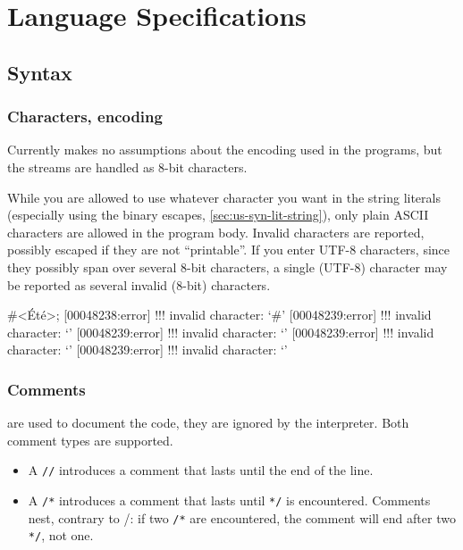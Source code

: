 \chapter{\us Language Specifications}
\label{sec:lang}

\section{Syntax}

\subsection{Characters, encoding}

Currently \us makes no assumptions about the encoding used in the
programs, but the streams are handled as 8-bit characters.

While you are allowed to use whatever character you want in the string
literals (especially using the binary escapes,
\autoref{sec:us-syn-lit-string}), only plain ASCII characters are
allowed in the program body.  Invalid characters are reported,
possibly escaped if they are not ``printable''.  If you enter UTF-8
characters, since they possibly span over several 8-bit characters, a
single (UTF-8) character may be reported as several invalid (8-bit)
characters.

\begin{urbiscript}[escapeinside=<>,firstnumber=last]
#<Été>;
[00048238:error] !!! invalid character: `#'
[00048239:error] !!! invalid character: `'
[00048239:error] !!! invalid character: `'
[00048239:error] !!! invalid character: `'
[00048239:error] !!! invalid character: `'
\end{urbiscript}

\subsection{Comments}

 are used to document the code, they are ignored by the
\us interpreter. Both \Cxx comment types are supported.

\begin{itemize}
\item A \lstinline|//| introduces a comment that lasts until the end
  of the line.
\item A \lstinline|/*| introduces a comment that lasts until
  \lstinline|*/| is encountered. Comments nest, contrary to \C/\Cxx:
  if two \lstinline|/*| are encountered, the
  comment will end after two \lstinline|*/|, not one.
\end{itemize}

